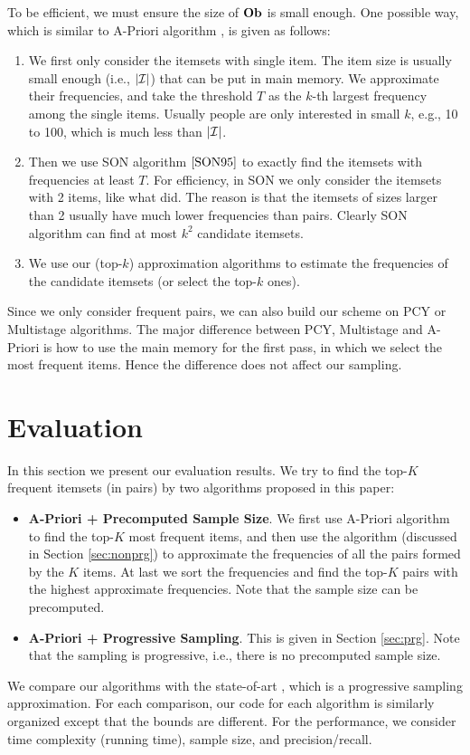 \documentclass{article}
\begin{document}
To be efficient, we must ensure the size of $\mathbf{Ob}$ is small enough. One possible way, which is similar to A-Priori algorithm \cite{AIS93}, is given as follows:
\begin{enumerate}
\item We first only consider the itemsets with single item. The item size is usually small enough (i.e., $|\mathcal{I}|$) that can be put in main memory. We approximate their frequencies, and take the threshold $T$ as the $k$-th largest frequency among the single items. Usually people are only interested in small $k$, e.g., 10 to 100, which is much less than $|\mathcal{I}|$.
\item Then we use SON algorithm $\cite{SON95}$ to exactly find the itemsets with frequencies at least $T$. For efficiency, in SON we only consider the itemsets with 2 items, like what \cite{LRU14} did. The reason is that the itemsets of sizes larger than 2 usually have much lower frequencies than pairs. Clearly SON algorithm can find at most $k^2$ candidate itemsets.
\item We use our (top-$k$) approximation algorithms to estimate the frequencies of the candidate itemsets (or select the top-$k$ ones).
\end{enumerate}
Since we only consider frequent pairs, we can also build our scheme on PCY or Multistage algorithms. The major difference between PCY, Multistage and A-Priori is how to use the main memory for the first pass, in which we select the most frequent items. Hence the difference does not affect our sampling.

\section{Evaluation}
\label{sec:eval}
In this section we present our evaluation results. 
We try to find the top-$K$ frequent itemsets (in pairs) by two algorithms proposed in this paper:
\begin{itemize}
\item {\bf A-Priori + Precomputed Sample Size}. We first use A-Priori algorithm to find the top-$K$ most frequent items, and then use the algorithm (discussed in Section \ref{sec:nonprg}) to approximate the frequencies of all the pairs formed by the $K$ items. At last we sort the frequencies and find the top-$K$ pairs with the highest approximate frequencies. Note that the sample size can be precomputed.
\item {\bf A-Priori + Progressive Sampling}. This is given in Section \ref{sec:prg}. Note that the sampling is progressive, i.e., there is no precomputed sample size.
\end{itemize}
We compare our algorithms with the state-of-art \cite{RU15}, which is a progressive sampling approximation. For each comparison, our code for each algorithm is similarly organized except that the bounds are different. 
For the performance, we consider time complexity (running time), sample size, and precision/recall.
\end{document}
